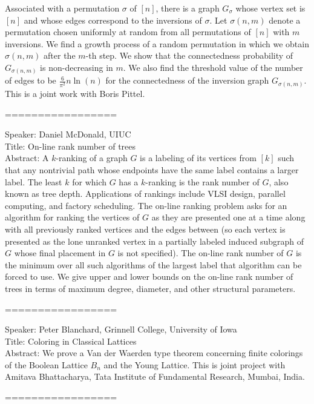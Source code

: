\documentclass[11pt]{article}
\begin{document}
Associated with a permutation $\sigma$ of $[n]$, there is a graph $G_{\sigma}$ whose vertex set is $[n]$ and whose edges correspond to the inversions of $\sigma$. Let $\sigma(n,m)$ denote a permutation chosen uniformly at random from all permutations of $[n]$ with $m$ inversions.  We find a growth process of a random permutation in which we obtain $\sigma(n,m)$ after the $m$-th step. We show that the connectedness probability of $G_{\sigma(n,m)}$ is non-decreasing in $m$. We also find the threshold value of the number of edges to be $\frac{6}{\pi^2}n\ln(n)$ for the connectedness of the inversion graph $G_{\sigma(n,m)}$. This is a joint work with Boris Pittel.

=================



Speaker: Daniel McDonald, UIUC\\
Title: On-line rank number of trees\\
Abstract: A $k$-ranking of a graph $G$ is a labeling of its vertices from $[k]$ such that any nontrivial path whose endpoints have the same label contains a larger label.  The least $k$ for which $G$ has a $k$-ranking is the rank number of $G$, also known as tree depth.  Applications of rankings include VLSI design, parallel computing, and factory scheduling. The on-line ranking problem asks for an algorithm for ranking the vertices of $G$ as they are presented one at a time along with all previously ranked vertices and the edges between (so each vertex is presented as the lone unranked vertex in a partially labeled induced subgraph of $G$ whose final placement in $G$ is not specified).  The on-line rank number of $G$ is the minimum over all such algorithms of the largest label that algorithm can be forced to use.  We give upper and lower bounds on the on-line rank number of trees in terms of maximum degree, diameter, and other structural parameters.


=================



Speaker: Peter Blanchard, Grinnell College, University of Iowa\\
Title: Coloring in Classical Lattices\\
Abstract: We prove a Van der Waerden type theorem concerning finite colorings of the Boolean Lattice $B_n$ and the Young Lattice.  This is joint project with Amitava Bhattacharya, Tata Institute of Fundamental Research, Mumbai, India.


=================
\end{document}
